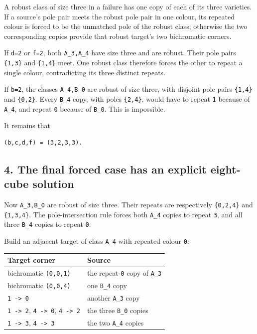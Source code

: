 \documentclass[
  10pt,
]{article}
\begin{document}
A robust class of size three in a failure has one copy of each of its
three varieties. If a source's pole pair meets the robust pole pair in
one colour, its repeated colour is forced to be the unmatched pole of
the robust class; otherwise the two corresponding copies provide that
robust target's two bichromatic corners.

If \texttt{d=2} or \texttt{f=2}, both \texttt{A\_3,A\_4} have size three
and are robust. Their pole pairs \texttt{\{1,3\}} and \texttt{\{1,4\}}
meet. One robust class therefore forces the other to repeat a single
colour, contradicting its three distinct repeats.

If \texttt{b=2}, the classes \texttt{A\_4,B\_0} are robust of size
three, with disjoint pole pairs \texttt{\{1,4\}} and \texttt{\{0,2\}}.
Every \texttt{B\_4} copy, with poles \texttt{\{2,4\}}, would have to
repeat \texttt{1} because of \texttt{A\_4}, and repeat \texttt{0}
because of \texttt{B\_0}. This is impossible.

It remains that

\begin{verbatim}
(b,c,d,f) = (3,2,3,3).
\end{verbatim}

\hypertarget{the-final-forced-case-has-an-explicit-eight-cube-solution}{%
\subsection*{4. The final forced case has an explicit eight-cube
solution}\label{the-final-forced-case-has-an-explicit-eight-cube-solution}}

Now \texttt{A\_3,B\_0} are robust of size three. Their repeats are
respectively \texttt{\{0,2,4\}} and \texttt{\{1,3,4\}}. The
pole-intersection rule forces both \texttt{A\_4} copies to repeat
\texttt{3}, and all three \texttt{B\_4} copies to repeat \texttt{0}.

Build an adjacent target of class \texttt{A\_4} with repeated colour
\texttt{0}:

\begin{longtable}[]{@{}ll@{}}
\toprule\noalign{}
Target corner & Source \\
\midrule\noalign{}
\endhead
\bottomrule\noalign{}
\endlastfoot
bichromatic \texttt{(0,0,1)} & the repeat-\texttt{0} copy of
\texttt{A\_3} \\
bichromatic \texttt{(0,0,4)} & one \texttt{B\_4} copy \\
\texttt{1\ -\textgreater{}\ 0} & another \texttt{A\_3} copy \\
\texttt{1\ -\textgreater{}\ 2}, \texttt{4\ -\textgreater{}\ 0},
\texttt{4\ -\textgreater{}\ 2} & the three \texttt{B\_0} copies \\
\texttt{1\ -\textgreater{}\ 3}, \texttt{4\ -\textgreater{}\ 3} & the two
\texttt{A\_4} copies \\
\end{longtable}
\end{document}
